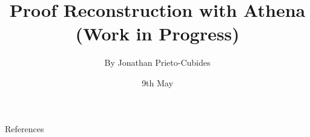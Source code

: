 \documentclass[hyperref={pdfpagelabels=false}]{beamer}
\title{Proof Reconstruction with Athena\\(Work in Progress)}
\date{9th May}
\author{By Jonathan Prieto-Cubides}
\institute{
EAFIT University\\
Medell\'in, Colombia
}
\begin{document}
\setcounter{page}{1}
\maketitle





\begin{frame}{References}

\end{frame}
\end{document}
